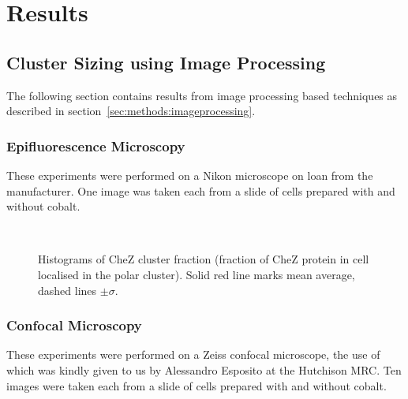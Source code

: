\documentclass[../main.tex]{subfiles}
\begin{document}
\section{Results}

\subsection{Cluster Sizing using Image Processing}

The following section contains results from image processing based techniques as described in section~\ref{sec:methods:imageprocessing}.

\subsubsection{Epifluorescence Microscopy}
\label{sec:results:cs:epi}

These experiments were performed on a Nikon microscope on loan from the manufacturer. One image was taken each from a slide of cells prepared with and without cobalt.

\begin{figure}[h!]
\begin{center}
\\
\caption{Histograms of CheZ cluster fraction (fraction of CheZ protein in cell localised in the polar cluster). Solid red line marks mean average, dashed lines \(\pm\sigma\).}
\label{fig:results:nikon}
\end{center}
\end{figure}

\subsubsection{Confocal Microscopy}
\label{sec:results:cs:confocal}
These experiments were performed on a Zeiss confocal microscope, the use of which was kindly given to us by Alessandro Esposito at the Hutchison MRC. Ten images were taken each from a slide of cells prepared with and without cobalt.
\end{document}
